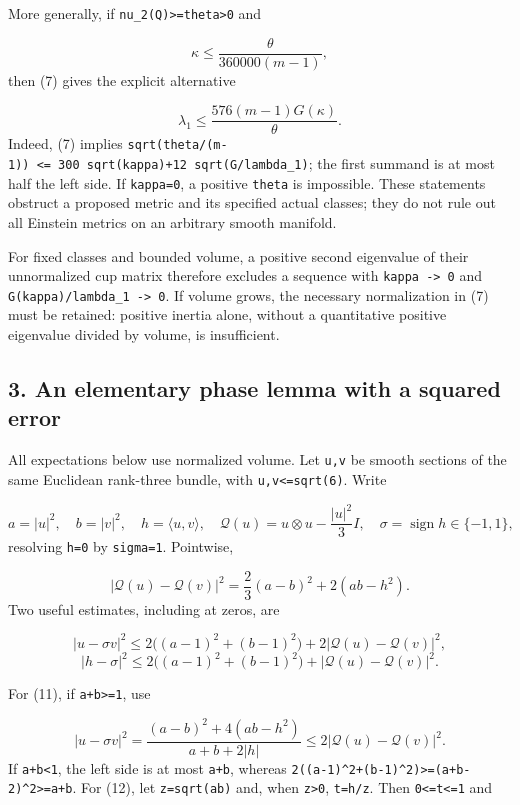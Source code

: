 \documentclass[
  11pt,
]{article}
\begin{document}
More generally, if \texttt{nu\_2(Q)\textgreater{}=theta\textgreater{}0}
and

\[
 \kappa\le\frac{\theta}{360000(m-1)},
\] then (7) gives the explicit alternative

\[
 \boxed{\lambda_1\le\frac{576(m-1)G(\kappa)}{\theta}.}
 \tag{9}
\] Indeed, (7) implies
\texttt{sqrt(theta/(m-1))\ \textless{}=\ 300\ sqrt(kappa)+12\ sqrt(G/lambda\_1)};
the first summand is at most half the left side. If \texttt{kappa=0}, a
positive \texttt{theta} is impossible. These statements obstruct a
proposed metric and its specified actual classes; they do not rule out
all Einstein metrics on an arbitrary smooth manifold.

For fixed classes and bounded volume, a positive second eigenvalue of
their unnormalized cup matrix therefore excludes a sequence with
\texttt{kappa\ -\textgreater{}\ 0} and
\texttt{G(kappa)/lambda\_1\ -\textgreater{}\ 0}. If volume grows, the
necessary normalization in (7) must be retained: positive inertia alone,
without a quantitative positive eigenvalue divided by volume, is
insufficient.

\hypertarget{an-elementary-phase-lemma-with-a-squared-error}{%
\subsection{3. An elementary phase lemma with a squared
error}\label{an-elementary-phase-lemma-with-a-squared-error}}

All expectations below use normalized volume. Let \texttt{u,v} be smooth
sections of the same Euclidean rank-three bundle, with
\texttt{\textbar{}u\textbar{},\textbar{}v\textbar{}\textless{}=sqrt(6)}.
Write

\[
 a=|u|^2,\quad b=|v|^2,\quad h=\langle u,v\rangle,\quad
 \mathcal Q(u)=u\otimes u-\frac{|u|^2}{3}I,
 \quad \sigma=\operatorname{sign}h\in\{-1,1\},
\] resolving \texttt{h=0} by \texttt{sigma=1}. Pointwise,

\[
 |\mathcal Q(u)-\mathcal Q(v)|^2
       =\frac23(a-b)^2+2(ab-h^2).                 \tag{10}
\] Two useful estimates, including at zeros, are

\[
 |u-\sigma v|^2
 \le2\bigl((a-1)^2+(b-1)^2\bigr)
                    +2|\mathcal Q(u)-\mathcal Q(v)|^2,\tag{11}
\] \[
 |h-\sigma|^2
 \le2\bigl((a-1)^2+(b-1)^2\bigr)
                       +|\mathcal Q(u)-\mathcal Q(v)|^2.\tag{12}
\]

For (11), if \texttt{a+b\textgreater{}=1}, use

\[
 |u-\sigma v|^2
 =\frac{(a-b)^2+4(ab-h^2)}{a+b+2|h|}
 \le2|\mathcal Q(u)-\mathcal Q(v)|^2.
\] If \texttt{a+b\textless{}1}, the left side is at most \texttt{a+b},
whereas
\texttt{2((a-1)\^{}2+(b-1)\^{}2)\textgreater{}=(a+b-2)\^{}2\textgreater{}=a+b}.
For (12), let \texttt{z=sqrt(ab)} and, when \texttt{z\textgreater{}0},
\texttt{t=\textbar{}h\textbar{}/z}. Then
\texttt{0\textless{}=t\textless{}=1} and
\end{document}

